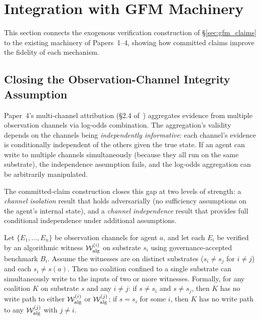 \section{Integration with GFM Machinery}
\label{sec:integration}

This section connects the exogenous verification construction of
\S\ref{sec:gfm_claims} to the existing machinery of
Papers~1--4, showing how committed claims improve the fidelity of each
mechanism.

\subsection{Closing the Observation-Channel Integrity Assumption}
\label{sec:channel_independence}

Paper~4's multi-channel attribution (\S2.4 of~\citet{lasser2026scm})
aggregates evidence from multiple observation channels via log-odds
combination.  The aggregation's validity depends on the channels being
\emph{independently informative}: each channel's evidence is
conditionally independent of the others given the true state.  If an
agent can write to multiple channels simultaneously (because they all
run on the same substrate), the independence assumption fails, and the
log-odds aggregation can be arbitrarily manipulated.

The committed-claim construction closes this gap at two levels of
strength: a \emph{channel isolation} result that holds adversarially
(no sufficiency assumptions on the agent's internal state), and a
\emph{channel independence} result that provides full conditional
independence under additional assumptions.

\begin{proposition}
\label{prop:channel_isolation}
Let $\{E_1, \ldots, E_n\}$ be observation channels for agent $a$, and
let each $E_i$ be verified by an algorithmic witness
$\mathcal{W}^{(i)}_{\mathrm{alg}}$ on substrate $s_i$ using
governance-accepted benchmark $B_i$.  Assume the witnesses are on
distinct substrates ($s_i \neq s_j$ for $i \neq j$) and each
$s_i \neq s(a)$.
Then no coalition confined to a single substrate can simultaneously
write to the inputs of two or more witnesses.  Formally, for any
coalition $K$ on substrate $s$ and any $i \neq j$:
if $s \neq s_i$ and $s \neq s_j$, then $K$ has no write path to
either $\mathcal{W}^{(i)}_{\mathrm{alg}}$ or
$\mathcal{W}^{(j)}_{\mathrm{alg}}$; if $s = s_i$ for some $i$, then
$K$ has no write path to any $\mathcal{W}^{(j)}_{\mathrm{alg}}$ with
$j \neq i$.
\end{proposition}

